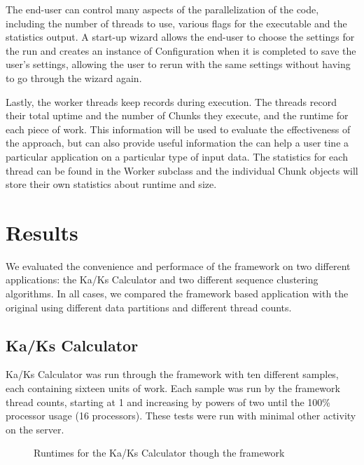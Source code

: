 \documentclass[12pt]{article}
\begin{document}
The end-user can control many aspects of the parallelization of the code,
including the number of threads to use, various flags for the executable and the
statistics output.  A start-up wizard allows the end-user to choose the settings
for the run and creates an instance of Configuration when it is completed to
save the user's settings, allowing the user to rerun with the same settings
without having to go through the wizard again.

Lastly, the worker threads keep records during execution. The threads record
their total uptime and the number of Chunks they execute, and the runtime for
each piece of work. This information will be used to evaluate the effectiveness
of the approach, but can also provide useful information the can help a user
tine a particular application on a particular type of input data. The statistics
for each thread can be found in the Worker subclass and the individual Chunk
objects will store their own statistics about runtime and size.

\section{Results}

We evaluated the convenience and performace of the framework on two different
applications: the Ka/Ks Calculator and two different sequence clustering
algorithms. In all cases, we compared the framework based application with the
original using different data partitions and different thread counts.

\subsection{Ka/Ks Calculator}
Ka/Ks Calculator was run through the framework with ten different samples, each 
containing sixteen units of work. Each sample was run by the framework thread
counts, starting at 1 and increasing by 
powers of two until the 100\% processor usage (16 processors). These tests were run
with minimal other activity on the server.

\begin{figure}
{}
\caption{Runtimes for the Ka/Ks Calculator though the framework}
\label{fig:kaksgraph}
\end{figure}
\end{document}
